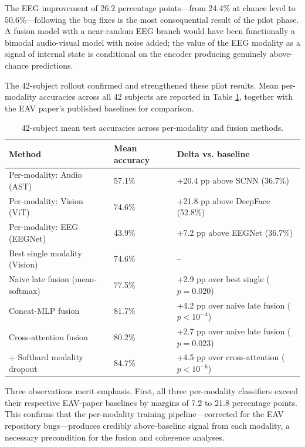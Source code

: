 The EEG improvement of 26.2 percentage points---from 24.4\% at chance level to 50.6\%---following the bug fixes is the most consequential result of the pilot phase. A fusion model with a near-random EEG branch would have been functionally a bimodal audio-visual model with noise added; the value of the EEG modality as a signal of internal state is conditional on the encoder producing genuinely above-chance predictions.

The 42-subject rollout confirmed and strengthened these pilot results. Mean per-modality accuracies across all 42 subjects are reported in Table \ref{tab:full_rollout_accuracy}, together with the EAV paper's published baselines for comparison.

\begin{table}[htbp]
\centering
\small
\caption{42-subject mean test accuracies across per-modality and fusion methods.}
\label{tab:full_rollout_accuracy}
\begin{tabular}{p{5.0cm} p{3.6cm} p{5.1cm}}
\hline
\textbf{Method} & \textbf{Mean accuracy} & \textbf{Delta vs. baseline} \\
\hline
Per-modality: Audio (AST) & 57.1\% & +20.4 pp above SCNN (36.7\%) \\
Per-modality: Vision (ViT) & 74.6\% & +21.8 pp above DeepFace (52.8\%) \\
Per-modality: EEG (EEGNet) & 43.9\% & +7.2 pp above EEGNet (36.7\%) \\
Best single modality (Vision) & 74.6\% & -- \\
Naive late fusion (mean-softmax) & 77.5\% & +2.9 pp over best single  ($p=0.020$) \\
Concat-MLP fusion & 81.7\% & +4.2 pp over naive late fusion  ($p<10^{-4}$) \\
Cross-attention fusion & 80.2\% & +2.7 pp over naive late fusion  ($p=0.023$) \\
+ Softhard modality dropout & 84.7\% & +4.5 pp over cross-attention  ($p<10^{-6}$) \\
\hline
\end{tabular}
\end{table}

Three observations merit emphasis. First, all three per-modality classifiers exceed their respective EAV-paper baselines by margins of 7.2 to 21.8 percentage points. This confirms that the per-modality training pipeline---corrected for the EAV repository bugs---produces credibly above-baseline signal from each modality, a necessary precondition for the fusion and coherence analyses.

